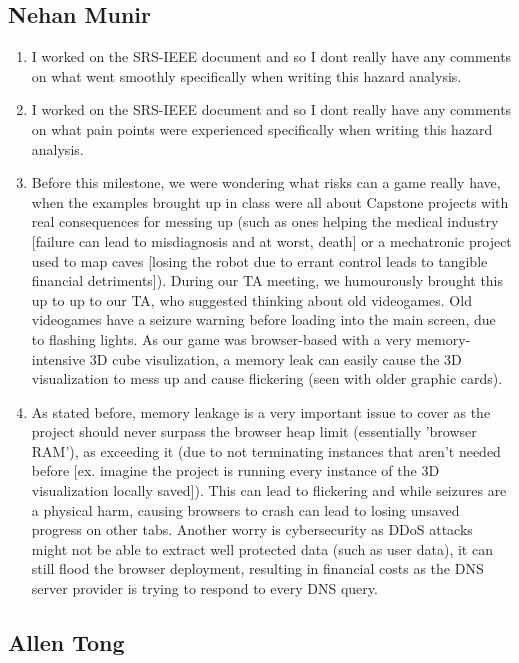 \documentclass{article}
\begin{document}
\subsection*{Nehan Munir}
\begin{enumerate}
    \item I worked on the SRS-IEEE document and so I dont really have any comments on what went smoothly specifically when
    writing this hazard analysis.
    \item I worked on the SRS-IEEE document and so I dont really have any comments on what pain points were experienced 
    specifically when writing this hazard analysis.
    \item Before this milestone, we were wondering what risks can a game really have, when the examples brought up in class were all
    about Capstone projects with real consequences for messing up (such as ones helping the medical industry [failure can lead to misdiagnosis and at worst, death] 
    or a mechatronic project used to map caves [losing the robot due to errant control leads to tangible financial detriments]). During our TA meeting, we humourously
    brought this up to up to our TA, who suggested thinking about old videogames. Old videogames have a seizure warning before loading into the main screen, due to flashing lights.
    As our game was browser-based with a very memory-intensive 3D cube visulization, a memory leak can easily cause the 3D visualization to mess up and cause flickering (seen with older graphic cards).
    \item As stated before, memory leakage is a very important issue to cover as the project should never surpass the browser heap limit (essentially 'browser RAM'), as exceeding it (due to not 
    terminating instances that aren't needed before [ex. imagine the project is running every instance of the 3D visualization locally saved]). This can lead to flickering and while seizures are a physical harm,
    causing browsers to crash can lead to losing unsaved progress on other tabs. Another worry is cybersecurity as DDoS attacks might not be able to extract well protected data (such as user data), it can still flood
    the browser deployment, resulting in financial costs as the DNS server provider is trying to respond to every DNS query.
\end{enumerate}

\subsection*{Allen Tong}
\end{document}
